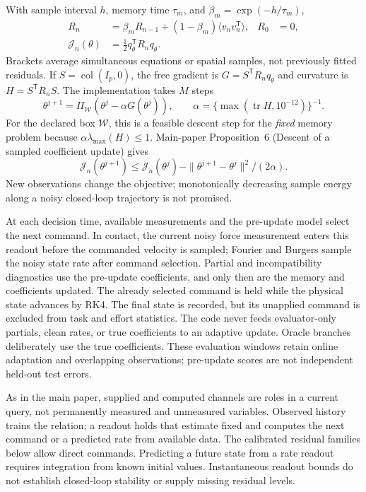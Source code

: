 \documentclass[journal]{IEEEtran}
\newcommand{\col}{\operatorname{col}}
\begin{document}
With sample interval $h$, memory time $\tau_m$, and
$\beta_m=\exp(-h/\tau_m)$,
\begin{align}
 R_n&=\beta_mR_{n-1}+(1-\beta_m)\langle v_nv_n^{\mathsf T}\rangle,
       &R_0&=0,\label{eq:discrete_memory}\\
 \mathcal J_n(\theta)&=\tfrac12q_\theta^{\mathsf T}R_nq_\theta.
 \label{eq:sampled_objective}
\end{align}
Brackets average simultaneous equations or spatial samples, not previously
fitted residuals. If $S=\col(I_p,0)$, the free gradient is
$G=S^{\mathsf T}R_nq_\theta$ and curvature is $H=S^{\mathsf T}R_nS$.
The implementation takes $M$ steps
\begin{equation}
 \theta^{j+1}=\Pi_{\mathcal W}(\theta^j-\alpha G(\theta^j)),\qquad
 \alpha=\{\max(\operatorname{tr}H,10^{-12})\}^{-1}.
 \label{eq:PG}
\end{equation}
For the declared box $\mathcal W$, this is a feasible descent step for the
\emph{fixed} memory problem because $\alpha\lambda_{\max}(H)\le1$.
Main-paper Proposition~6 (Descent of a sampled coefficient update) gives
\begin{equation}
 \mathcal J_n(\theta^{j+1})\le\mathcal J_n(\theta^j)
 -\|\theta^{j+1}-\theta^j\|^2/(2\alpha).
 \label{eq:discrete_descent}
\end{equation}
New observations change the objective; monotonically decreasing sample
energy along a noisy closed-loop trajectory is not promised.

At each decision time, available measurements and the pre-update model
select the next command. In contact, the current noisy force measurement
enters this readout before the commanded velocity is sampled; Fourier and
Burgers sample the noisy state rate after command selection. Partial and
incompatibility diagnostics use the pre-update coefficients, and only then
are the memory and coefficients updated. The already selected command is
held while the physical state advances by RK4. The final state is recorded,
but its unapplied command is excluded from task and effort statistics. The code never
feeds evaluator-only partials, clean rates, or true coefficients to an
adaptive update. Oracle branches deliberately use the true coefficients.
These evaluation windows retain online adaptation and overlapping
observations; pre-update scores are not independent held-out test errors.

As in the main paper, supplied and computed channels are roles in a current
query, not permanently measured and unmeasured variables. Observed history
trains the relation; a readout holds that estimate fixed and computes the
next command or a predicted rate from available data. The calibrated residual
families below allow direct commands. Predicting a future state from a rate
readout requires integration from known initial values. Instantaneous readout bounds do not
establish closed-loop stability or supply missing residual levels.
\end{document}
